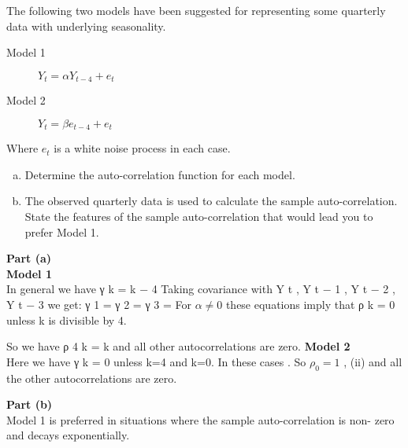 \documentclass[a4paper,12pt]{article}
\begin{document}
 
\large
\noindent The following two models have been suggested for representing some quarterly data
with underlying seasonality.

\begin{description}
\item[Model 1] ${ \displaystyle  Y_t = \alpha Y_{t − 4} + e_t }$
\item[Model 2] ${ \displaystyle Y_t = \beta e_{t − 4} +  e_t }$
\end{description}


Where $e_t$ is a white noise process in each case.
\begin{enumerate}[(a)]
\item
Determine the auto-correlation function for each model.
\item 
The observed quarterly data is used to calculate the sample auto-correlation.
State the features of the sample auto-correlation that would lead you to prefer
Model 1.
\end{enumerate}

\noindent \textbf{Part (a)} \\
\noindent \textbf{Model 1} \\

In general we have γ k =  k − 4
Taking covariance with Y t , Y t − 1 , Y t − 2 , Y t − 3 we get:
γ 1 = 
γ 2 = 
γ 3 = 
For $\alpha \neq 0$ these equations imply that ρ k = 0 unless k is divisible by 4.

So we have ρ 4 k = \alpha k and all other autocorrelations are zero.
\noindent \textbf{Model 2} \\
Here we have γ k = 0 unless k=4 and k=0. In these cases
.
So $\rho_0 = 1$ ,
(ii)
and all the other autocorrelations are zero.


\noindent \textbf{Part (b)} \\
Model 1 is preferred in situations where the sample auto-correlation is non-
zero and decays exponentially.

\end{document}
